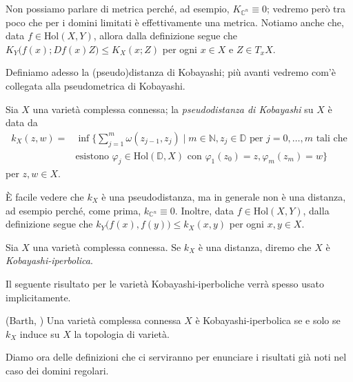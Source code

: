 \begin{oss}
    Non possiamo parlare di metrica perché, ad esempio, $K_{\mathbb{C}^n}\equiv 0$; vedremo però tra poco che per i domini limitati è effettivamente una metrica. Notiamo anche che, data $f \in \text{Hol}(X,Y)$, allora dalla definizione segue che $K_Y\big(f(x);Df(x)Z\big) \le K_X(x;Z)$ per ogni $x \in X$ e $Z \in T_xX$.
\end{oss}

Definiamo adesso la (pseudo)distanza di Kobayashi; più avanti vedremo com'è collegata alla pseudometrica di Kobayashi.

\begin{defn}
    Sia $X$ una varietà complessa connessa; la \textit{pseudodistanza di Kobayashi} su $X$ è data da
    \begin{equation}\begin{split}
        k_X(z,w)=&\inf\Bigg\{\sum_{j=1}^m \omega(z_{j-1},z_j) \mid m \in \mathbb{N}, z_j \in \mathbb{D}\text{ per }j=0,\dots,m\text{ tali che}\\
        &\text{esistono }\varphi_j\in \text{Hol}(\mathbb{D},X) \text{ con } \varphi_1(z_0)=z,\varphi_m(z_m)=w\Bigg\}
    \end{split}\end{equation}
    per $z,w \in X$.
\end{defn}

\begin{oss} \label{k_lip}
    È facile vedere che $k_X$ è una pseudodistanza, ma in generale non è una distanza, ad esempio perché, come prima, $k_{\mathbb{C}^n}\equiv 0$. Inoltre, data $f \in \text{Hol}(X,Y)$, dalla definizione segue che $k_Y\big(f(x),f(y)\big) \le k_X(x,y)$ per ogni $x,y \in X$.
\end{oss}

\begin{defn}
    Sia $X$ una varietà complessa connessa. Se $k_X$ è una distanza, diremo che $X$ è \textit{Kobayashi-iperbolica}.
\end{defn}

Il seguente risultato per le varietà Kobayashi-iperboliche verrà spesso usato implicitamente.

\begin{prop}
    (Barth, \cite{B}) Una varietà complessa connessa $X$ è Kobayashi-iperbolica se e solo se $k_X$ induce su $X$ la topologia di varietà.
\end{prop}

Diamo ora delle definizioni che ci serviranno per enunciare i risultati già noti nel caso dei domini regolari.

